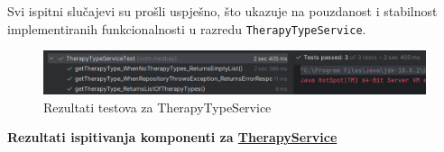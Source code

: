 			Svi ispitni slučajevi su prošli uspješno, što ukazuje na pouzdanost i stabilnost implementiranih funkcionalnosti u razredu \texttt{TherapyTypeService}. 
			\begin{figure}[h]
				\centering
				\includegraphics[width=1\linewidth]{slike/therapyTypeServiceTest.png}
				\caption{Rezultati testova za TherapyTypeService}
				\label{fig:enter-label}
			\end{figure}

			\newblock \textbf{Rezultati ispitivanja komponenti za \href{https://github.com/Project-MedBay/backend/blob/main/src/test/java/com/medbay/TherapyServiceTest.java}{TherapyService}}

